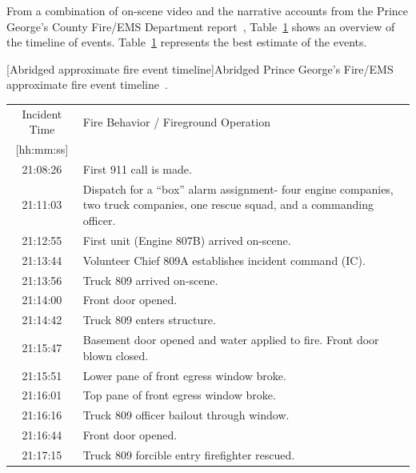 \documentclass[12pt,oneside]{book}
\begin{document}
From a combination of on-scene video and the narrative accounts from the Prince George's County Fire/EMS Department report~\cite{PGCounty2013}, Table~\ref{tab:fire_info} shows an overview of the timeline of events. Table~\ref{tab:fire_info} represents the best estimate of the events.

\begin{table}[!h]
\centering
{}[Abridged approximate fire event timeline]{Abridged Prince George's Fire/EMS approximate fire event timeline~\cite{PGCounty2013}.}\label{tab:fire_info}
\begin{tabular}{cl}
\toprule[1.5pt]
Incident Time              &  Fire Behavior / Fireground Operation  \\
{[hh:mm:ss]}               &                                        \\
\midrule
21:08:26   & First 911 call is made. \\[.25cm]
\multirow{3}{*}{21:11:03}  &   \multirow{3}{*}{\parbox{10cm} {Dispatch for a ``box'' alarm assignment- four engine companies, two truck companies, one rescue squad, and a commanding officer.}}    \\
                           &         \\
                           &         \\[.25cm]
21:12:55  &  First unit (Engine 807B) arrived on-scene.  \\[.25cm]
21:13:44  & Volunteer Chief 809A establishes incident command (IC).   \\[.25cm]
21:13:56  & Truck 809 arrived on-scene. \\[.25cm]
21:14:00  & Front door opened. \\[.25cm]
21:14:42  & Truck 809 enters structure. \\[.25cm]
21:15:47  & Basement door opened and water applied to fire. Front door blown closed. \\[.25cm]
21:15:51  & Lower pane of front egress window broke. \\[.25cm]
21:16:01  & Top pane of front egress window broke. \\[.25cm]
21:16:16  & Truck 809 officer bailout through window. \\[.25cm]
21:16:44  & Front door opened. \\[.25cm]
21:17:15  & Truck 809 forcible entry firefighter rescued. \\[.25cm]
\bottomrule[1.25pt]
\end{tabular}\par
\end{table}
\end{document}
